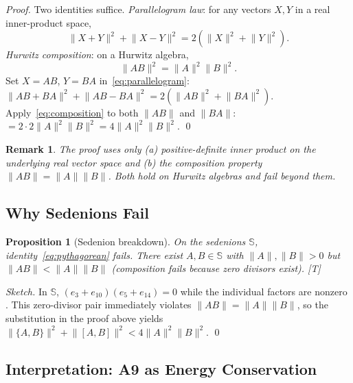 \documentclass[11pt, a4paper]{article}
\newtheorem{proposition}{Proposition}
\newtheorem*{remark}{Remark}
\newcommand{\Sed}{\mathbb{S}}
\newcommand{\norm}[1]{\lVert #1 \rVert}
\begin{document}
\begin{proof}
Two identities suffice.
\emph{Parallelogram law}: for any vectors $X, Y$ in a real inner-product
space,
\begin{equation}
\norm{X+Y}^2 + \norm{X-Y}^2 = 2(\norm{X}^2 + \norm{Y}^2).
\label{eq:parallelogram}
\end{equation}
\emph{Hurwitz composition}: on a Hurwitz algebra,
\begin{equation}
\norm{AB}^2 = \norm{A}^2 \norm{B}^2.
\label{eq:composition}
\end{equation}
Set $X = AB$, $Y = BA$ in~\eqref{eq:parallelogram}:
$\norm{AB + BA}^2 + \norm{AB - BA}^2 = 2(\norm{AB}^2 + \norm{BA}^2)$.
Apply~\eqref{eq:composition} to both $\norm{AB}$ and $\norm{BA}$:
$= 2 \cdot 2 \norm{A}^2 \norm{B}^2 = 4\norm{A}^2 \norm{B}^2$. \qed
\end{proof}

\begin{remark}
The proof uses only (a) positive-definite inner product on the
underlying real vector space and (b) the composition property
$\norm{AB} = \norm{A}\norm{B}$. Both hold on Hurwitz algebras and
fail beyond them.
\end{remark}

\subsection{Why Sedenions Fail}

\begin{proposition}[Sedenion breakdown]
\label{prop:sedenion_fail}
On the sedenions $\Sed$, identity~\eqref{eq:pythagorean} fails. There
exist $A, B \in \Sed$ with $\norm{A}, \norm{B} > 0$ but
$\norm{AB} < \norm{A}\norm{B}$ (composition fails because zero divisors
exist). [T]
\end{proposition}

\begin{proof}[Sketch]
In $\Sed$, $(e_3 + e_{10})(e_5 + e_{14}) = 0$ while the individual
factors are nonzero \citep{Imaeda2000}. This zero-divisor pair
immediately violates $\norm{AB} = \norm{A}\norm{B}$, so the substitution
in the proof above yields $\norm{\{A,B\}}^2 + \norm{[A,B]}^2 < 4\norm{A}^2\norm{B}^2$.
\qed
\end{proof}

\subsection{Interpretation: A9 as Energy Conservation}
\end{document}
